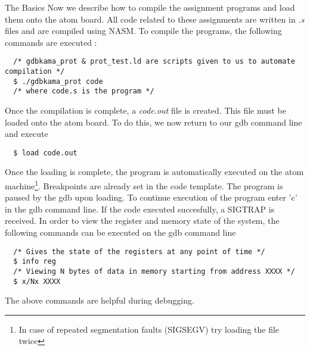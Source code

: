 \documentclass[a4paper,12pt]{report}
\begin{document}
\begin{section}{The Basics}
Now we describe how to compile the assignment programs and load them onto the atom board. All code related to these assignments are written 
in \textit{.s} files and are compiled using NASM. To compile the programs, the following commands are executed :
\begin{verbatim}
  /* gdbkama_prot & prot_test.ld are scripts given to us to automate compilation */
  $ ./gdbkama_prot code 
  /* where code.s is the program */
\end{verbatim}
Once the compilation is complete, a \textit{code.out} file is created. This file must be loaded onto the atom board.
To do this, we now return to our gdb command line and execute 
\begin{verbatim}
  $ load code.out
\end{verbatim}
  Once the loading is complete, the program is automatically executed on the atom machine\footnote{In case of repeated segmentation
faults (SIGSEGV) try loading the file twice}. Breakpoints are already set in the code template. The program is paused by the gdb upon loading.
To continue execution of the program enter 'c' in the gdb command line. If the code executed succesfully, a SIGTRAP is received. 
In order to view the register and memory state of the system, the following commands can be executed on the gdb command line
\begin{verbatim}
  /* Gives the state of the registers at any point of time */
  $ info reg 
  /* Viewing N bytes of data in memory starting from address XXXX */
  $ x/Nx XXXX
\end{verbatim}
The above commands are helpful during debugging.
 




\end{section}
\end{document}
